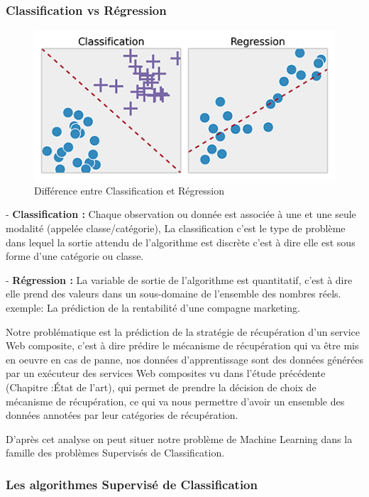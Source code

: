 \subsubsection{Classification vs Régression }

\begin{figure}[H]
\begin{center}
\includegraphics[width=0.8\linewidth]{images/ClassReg.png}
\end{center}
\caption{Différence entre Classification et Régression}
\label{fig:7}
\end{figure}

- \textbf{Classification :} Chaque observation ou donnée  est associée à une et une seule modalité (appelée classe/catégorie), La classification c'est le type de problème dans lequel la sortie attendu de l'algorithme est discrète c'est à dire elle est sous forme d'une catégorie ou classe.
    
    
- \textbf{Régression :} La variable de sortie de l'algorithme est quantitatif, c'est à dire elle  prend des valeurs dans un sous-domaine de l’ensemble des nombres réels. exemple: La prédiction de la rentabilité d'une compagne marketing. 


Notre problématique est la prédiction de la stratégie de récupération d'un service Web composite, c'est à dire prédire le mécanisme de récupération qui va être mis en oeuvre en cas de panne, nos données d'apprentissage sont des données générées par  un exécuteur des services Web composites vu dans l'étude précédente (Chapitre :État de l'art), qui permet de prendre la décision de choix de mécanisme de récupération, ce qui va nous permettre d'avoir un ensemble des données annotées par leur catégories de récupération. 

D'après cet analyse on peut situer notre problème de Machine Learning dans la famille des problèmes Supervisés de Classification.

\subsubsection{Les algorithmes Supervisé de Classification}

